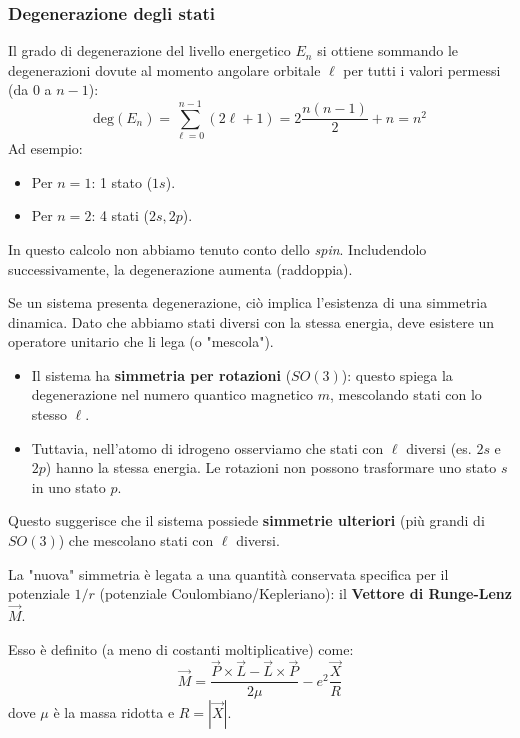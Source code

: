 \subsubsection{Degenerazione degli stati}
Il grado di degenerazione del livello energetico \( E_n \) si ottiene sommando le degenerazioni dovute al momento angolare orbitale \( \ell \) per tutti i valori permessi (da \( 0 \) a \( n-1 \)):
\[
\text{deg}(E_n) = \sum_{\ell=0}^{n-1} (2\ell+1) = 2\frac{n(n-1)}{2} + n = n^2
\]
Ad esempio:
\begin{itemize}
    \item Per \( n=1 \): 1 stato (\( 1s \)).
    \item Per \( n=2 \): 4 stati (\( 2s, 2p \)).
\end{itemize}
\begin{remark}
    In questo calcolo non abbiamo tenuto conto dello \textit{spin}. Includendolo successivamente, la degenerazione aumenta (raddoppia).
\end{remark}

Se un sistema presenta degenerazione, ciò implica l'esistenza di una simmetria dinamica. Dato che abbiamo stati diversi con la stessa energia, deve esistere un operatore unitario che li lega (o "mescola").

\begin{itemize}
    \item Il sistema ha \textbf{simmetria per rotazioni} (\( SO(3) \)): questo spiega la degenerazione nel numero quantico magnetico \( m \), mescolando stati con lo stesso \( \ell \).
    \item Tuttavia, nell'atomo di idrogeno osserviamo che stati con \( \ell \) diversi (es. \( 2s \) e \( 2p \)) hanno la stessa energia. Le rotazioni non possono trasformare uno stato \( s \) in uno stato \( p \).
\end{itemize}

Questo suggerisce che il sistema possiede \textbf{simmetrie ulteriori} (più grandi di \( SO(3) \)) che mescolano stati con \( \ell \) diversi.

La "nuova" simmetria è legata a una quantità conservata specifica per il potenziale \( 1/r \) (potenziale Coulombiano/Kepleriano): il \textbf{Vettore di Runge-Lenz} \( \vec{M} \).

Esso è definito (a meno di costanti moltiplicative) come:
\begin{equation}
    \vec{M} = \frac{\vec{P} \times \vec{L} - \vec{L} \times \vec{P}}{2\mu} - e^2 \frac{\vec{X}}{R}
\end{equation}
dove \( \mu \) è la massa ridotta e \( R = |\vec{X}| \).

